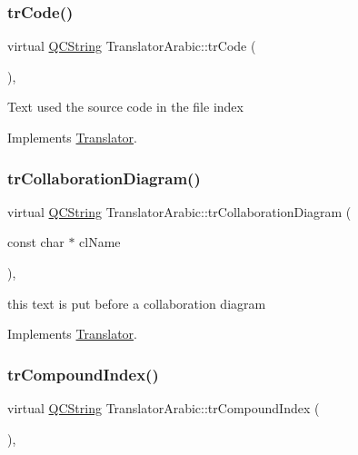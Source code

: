 \subsubsection{\texorpdfstring{trCode()}{trCode()}}
{\footnotesize\ttfamily virtual \mbox{\hyperlink{class_q_c_string}{Q\+C\+String}} Translator\+Arabic\+::tr\+Code (\begin{DoxyParamCaption}{ }\end{DoxyParamCaption})\hspace{0.3cm}{\ttfamily [inline]}, {\ttfamily [virtual]}}

Text used the source code in the file index 

Implements \mbox{\hyperlink{class_translator}{Translator}}.

\mbox{\label{class_translator_arabic_a6ca15143ebd2361a7b1245e5c5efca8c}} 
\subsubsection{\texorpdfstring{trCollaborationDiagram()}{trCollaborationDiagram()}}
{\footnotesize\ttfamily virtual \mbox{\hyperlink{class_q_c_string}{Q\+C\+String}} Translator\+Arabic\+::tr\+Collaboration\+Diagram (\begin{DoxyParamCaption}\item[{const char $\ast$}]{cl\+Name }\end{DoxyParamCaption})\hspace{0.3cm}{\ttfamily [inline]}, {\ttfamily [virtual]}}

this text is put before a collaboration diagram 

Implements \mbox{\hyperlink{class_translator}{Translator}}.

\mbox{\label{class_translator_arabic_ab554e3f789d9189e6fc94f00a1746983}} 
\subsubsection{\texorpdfstring{trCompoundIndex()}{trCompoundIndex()}}
{\footnotesize\ttfamily virtual \mbox{\hyperlink{class_q_c_string}{Q\+C\+String}} Translator\+Arabic\+::tr\+Compound\+Index (\begin{DoxyParamCaption}{ }\end{DoxyParamCaption})\hspace{0.3cm}{\ttfamily [inline]}, {\ttfamily [virtual]}}

